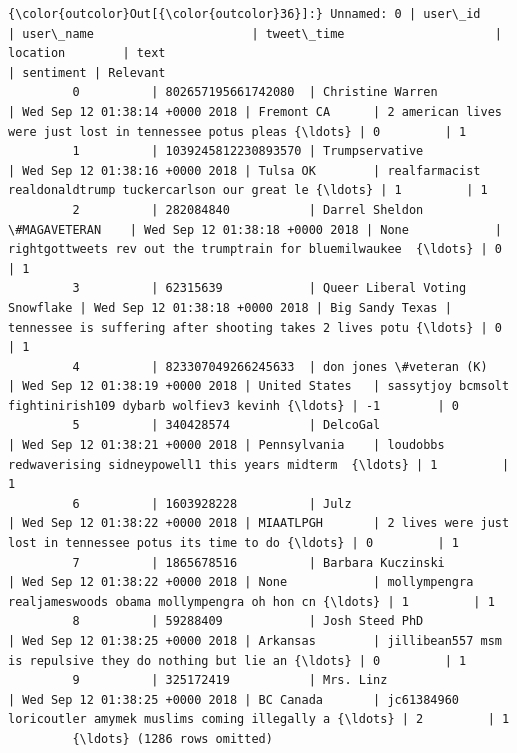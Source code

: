 \documentclass[11pt]{article}
\begin{document}
\begin{Verbatim}[commandchars=\\\{\}]
{\color{outcolor}Out[{\color{outcolor}36}]:} Unnamed: 0 | user\_id             | user\_name                      | tweet\_time                     | location        | text                                                         | sentiment | Relevant
         0          | 802657195661742080  | Christine Warren               | Wed Sep 12 01:38:14 +0000 2018 | Fremont CA      | 2 american lives were just lost in tennessee potus pleas {\ldots} | 0         | 1
         1          | 1039245812230893570 | Trumpservative                 | Wed Sep 12 01:38:16 +0000 2018 | Tulsa OK        | realfarmacist realdonaldtrump tuckercarlson our great le {\ldots} | 1         | 1
         2          | 282084840           | Darrel Sheldon \#MAGAVETERAN    | Wed Sep 12 01:38:18 +0000 2018 | None            | rightgottweets rev out the trumptrain for bluemilwaukee  {\ldots} | 0         | 1
         3          | 62315639            | Queer Liberal Voting Snowflake | Wed Sep 12 01:38:18 +0000 2018 | Big Sandy Texas | tennessee is suffering after shooting takes 2 lives potu {\ldots} | 0         | 1
         4          | 823307049266245633  | don jones \#veteran (K)         | Wed Sep 12 01:38:19 +0000 2018 | United States   | sassytjoy bcmsolt fightinirish109 dybarb wolfiev3 kevinh {\ldots} | -1        | 0
         5          | 340428574           | DelcoGal                       | Wed Sep 12 01:38:21 +0000 2018 | Pennsylvania    | loudobbs redwaverising sidneypowell1 this years midterm  {\ldots} | 1         | 1
         6          | 1603928228          | Julz                           | Wed Sep 12 01:38:22 +0000 2018 | MIAATLPGH       | 2 lives were just lost in tennessee potus its time to do {\ldots} | 0         | 1
         7          | 1865678516          | Barbara Kuczinski              | Wed Sep 12 01:38:22 +0000 2018 | None            | mollympengra realjameswoods obama mollympengra oh hon cn {\ldots} | 1         | 1
         8          | 59288409            | Josh Steed PhD                 | Wed Sep 12 01:38:25 +0000 2018 | Arkansas        | jillibean557 msm is repulsive they do nothing but lie an {\ldots} | 0         | 1
         9          | 325172419           | Mrs. Linz                      | Wed Sep 12 01:38:25 +0000 2018 | BC Canada       | jc61384960 loricoutler amymek muslims coming illegally a {\ldots} | 2         | 1
         {\ldots} (1286 rows omitted)
\end{Verbatim}
            
\end{document}

